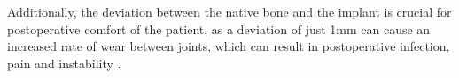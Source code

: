 \documentclass[../main.tex]{subfiles}
\begin{document}
Additionally, the deviation between the native bone and the implant is crucial for postoperative comfort of the patient, as a deviation of just 1mm can cause an increased rate of wear between joints, which can result in postoperative infection, pain and instability \cite{chungpei-hsuYingYongMoNiFenXiYuShiYanSheJiFaTanTaoJingGeZhiChengJieGouYiZuiXiaoHuaXuanZeXingLeiSheRongRongZhiReBianXingStudyLattice2024}  
\cite{kebbachComputerbasedAnalysisDifferent2023}.
 
\end{document}
